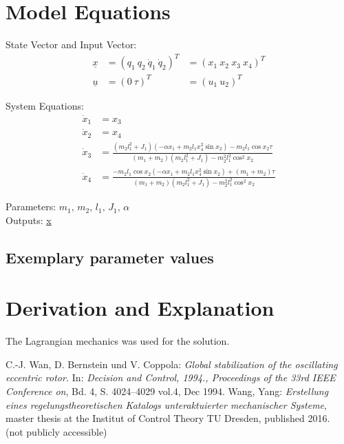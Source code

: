 \documentclass[10pt,a4paper]{article}
\begin{document}
	
	\section{Model Equations} %
	
	State Vector and Input Vector:
	\begin{align*}
		\underline{x} &= (q_1 \ q_2 \ \dot{q}_1 \ \dot{q}_2)^T &= (x_1 \ x_2 \ x_3 \ x_4)^T \\
		\underline{u} &= (0 \ \tau)^T &= (u_1 \ u_2)^T
	\end{align*}
	
	\noindent System Equations:			
	\begin{subequations}
	\begin{align}
		\dot{x}_1 &= x_3 \\
		\dot{x}_2 &= x_4 \\
		\dot{x}_3 &= \frac{(m_2l_1^2 + J_1)(-\alpha x_1 + m_2l_1x_4^2 \sin x_2) - m_2l_1 \cos x_2 \tau}{(m_1 + m_2)(m_2l_1^2 + J_1) - m_2^2l_1^2 \cos^2 x_2} \\
		\dot{x}_4 &= \frac{-m_2l_1 \cos x_2(-\alpha x_1 + m_2l_1x_4^2 \sin x_2) + (m_1 + m_2)\tau}{(m_1 + m_2)(m_2l_1^2 + J_1) - m_2^2l_1^2 \cos^2 x_2}		
	\end{align}
	\end{subequations}

	\noindent
	Parameters: $m_1, \, m_2, \, l_1, \, J_1, \, \alpha$ %
	\\
	Outputs: \underline{x}
	
	
	\subsection{Exemplary parameter values}
	

	
	\section{Derivation and Explanation} %
	
	The Lagrangian mechanics was used for the solution.
	
	
	\begin{thebibliography}{10}		
		C.-J. Wan, D. Bernstein und V. Coppola: 
		\textit{Global stabilization of the oscillating
eccentric rotor.} In: \textit{Decision and Control, 1994., Proceedings of the 33rd IEEE
Conference on}, Bd. 4, S. 4024–4029 vol.4, Dec 1994.
		Wang, Yang:  
		\textit{Erstellung eines regelungstheoretischen Katalogs unteraktuierter mechanischer Systeme}, master thesis at the Institut of Control Theory TU Dresden, published 2016. \\
		(not publicly accessible)
	\end{thebibliography}
\end{document}
